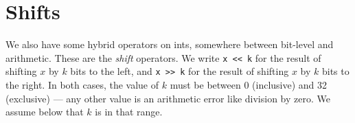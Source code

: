 

\section{Shifts}
\label{sec:ints:shifts}

We also have some hybrid operators on ints, somewhere between
bit-level and arithmetic.  These are the \emph{shift} operators.  We
write \lstinline'x << k' for the result of shifting $x$ by $k$ bits to the
left, and \lstinline'x >> k' for the result of shifting $x$ by $k$ bits to
the right.  In both cases, the value of $k$ must be between 0
(inclusive) and 32 (exclusive) --- any other value is an arithmetic
error like division by zero.  We assume below that $k$ is in that
range.

